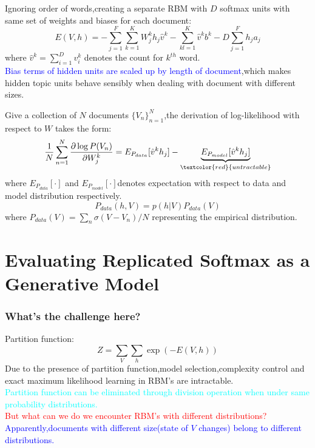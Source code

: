 \documentclass{beamer}
\begin{document}
\begin{CJK*}{UTF8}{gbsn}
\begin{frame}[allowframebreaks]
Ignoring order of words,creating a separate RBM with $D$ softmax units with same set of weights and biases for each document:
\begin{equation}
E(V,h)=-\sum_{j=1}^F\sum_{k=1}^KW_j^kh_j\hat{v}^k-\sum_{kl=1}^K\hat{v}^kb^k-D\sum_{j=1}^Fh_ja_j
\end{equation}
where $\hat{v}^k=\sum_{i=1}^Dv_i^k$ denotes the count for $k^{th}$ word.\\
\vspace{10pt}
\textcolor{blue}{Bias terms of hidden units are scaled up by length of document},which makes hidden topic units behave sensibly when dealing with document with different sizes.

\newpage
Give a collection of $N$ documents $\{V_n\}_{n=1}^N$,the derivation of log-likelihood with respect to $W$ takes the form:
\begin{equation}
\frac{1}{N}\sum_{n=1}^N\frac{\partial\log P(V_n)}{\partial W_j^k}=E_{P_{data}}[\hat{v}^kh_j]-\underbrace{E_{P_{model}}[\hat{v}^kh_j]}_{\textcolor{red}{untractable}}
\end{equation}
where $E_{P_{data}}[\cdot]$ and $E_{P_{model}}[\cdot]$denotes expectation with respect to data and model distribution respectively.
\begin{equation}
P_{data}(h,V)=p(h|V)P_{data}(V)
\end{equation}
where $P_{data}(V)=\sum_n\sigma(V-V_n)/N$ representing the empirical distribution.
\end{frame}

\section{Evaluating Replicated Softmax as a Generative Model}
\begin{frame}\frametitle{What's the challenge here?}
Partition function:
\begin{equation}
Z=\sum_V\sum_h\exp(-E(V,h))
\end{equation}
Due to the presence of partition function,model selection,complexity control and exact maximum likelihood learning in RBM's are intractable.\\
\vspace{10pt}
\textcolor{cyan}{Partition function can be eliminated through division operation when under same probability distributions.}\\
\vspace{10pt}
\textcolor{red}{But what can we do we encounter RBM's with different distributions?}\\
\vspace{10pt}
\textcolor{blue}{Apparently,documents with different size(state of $V$ changes) belong to different distributions.}
\end{frame}


\end{CJK*}
\end{document}
